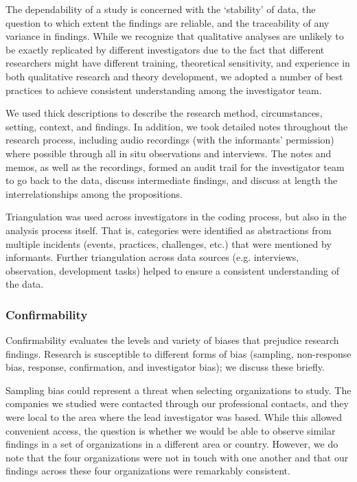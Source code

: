 \documentclass[smallextended]{svjour3}        %
\begin{document}
The dependability of a study is concerned with the `stability' of data, the question to which extent the findings are reliable, and the traceability of any variance in findings. While we recognize that qualitative analyses are unlikely to be exactly replicated by different investigators due to the fact that different researchers might have different training, theoretical sensitivity, and experience in both qualitative research and theory development, we adopted a number of best practices to achieve consistent understanding among the investigator team. 

We used thick descriptions to describe the research method, circumstances, setting, context, and findings. 
In addition, we took detailed notes throughout the research process, including audio recordings (with the informants' permission) where possible through all in situ observations and interviews.
The notes and memos, as well as the recordings, formed an audit trail for the investigator team to go back to the data, discuss intermediate findings, and discuss at length the interrelationships among the propositions. 

Triangulation was used across investigators in the coding process, but also in the analysis process itself. That is, categories were identified as abstractions from multiple incidents (events, practices, challenges, etc.) that were mentioned by informants. Further triangulation across data sources (e.g. interviews, observation, development tasks) helped to ensure a consistent understanding of the data. 


\subsubsection{Confirmability}

Confirmability evaluates the levels and variety of biases that prejudice research findings.
Research is susceptible to different forms of bias (sampling, non-response bias, response, confirmation, and investigator bias); we discuss these briefly.

{Sampling bias} could represent a threat when selecting organizations to study. The companies we studied were contacted through our professional contacts, and they were local to the area where the lead investigator was based. While this allowed convenient access, the question is whether we would be able to observe similar findings in a set of organizations in a different area or country. However, we do note that the four organizations were not in touch with one another and that our findings across these four organizations were remarkably consistent.
\end{document}
